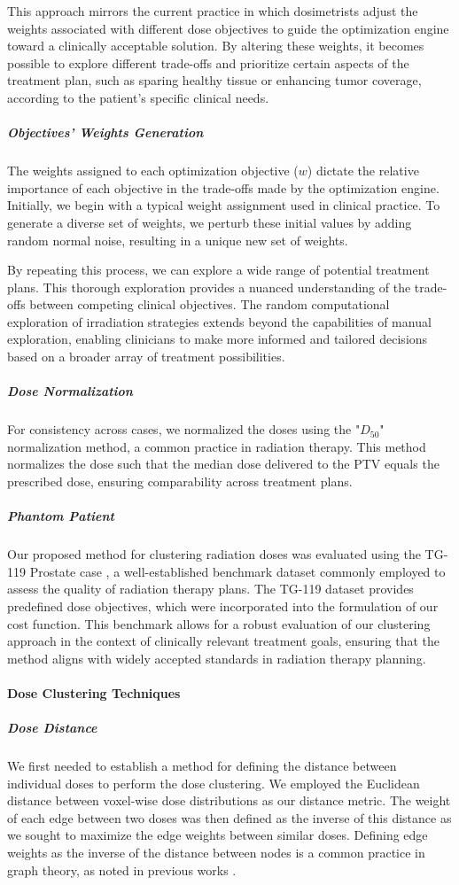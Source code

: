 This approach mirrors the current practice in which dosimetrists adjust the weights associated with different dose objectives to guide the optimization engine toward a clinically acceptable solution.
By altering these weights, it becomes possible to explore different trade-offs and prioritize certain aspects of the treatment plan, such as sparing healthy tissue or enhancing tumor coverage, according to the patient's specific clinical needs.

\subparagraph{Objectives’ Weights Generation}
The weights assigned to each optimization objective ($w$) dictate the relative importance of each objective in the trade-offs made by the optimization engine.
Initially, we begin with a typical weight assignment used in clinical practice.
To generate a diverse set of weights, we perturb these initial values by adding random normal noise, resulting in a unique new set of weights.

By repeating this process, we can explore a wide range of potential treatment plans.
This thorough exploration provides a nuanced understanding of the trade-offs between competing clinical objectives.
The random computational exploration of irradiation strategies extends beyond the capabilities of manual exploration, enabling clinicians to make more informed and tailored decisions based on a broader array of treatment possibilities.

\subparagraph{Dose Normalization}
For consistency across cases, we normalized the doses using the "$D_{50}$" normalization method, a common practice in radiation therapy.
This method normalizes the dose such that the median dose delivered to the PTV equals the prescribed dose, ensuring comparability across treatment plans.

\subparagraph{Phantom Patient}
Our proposed method for clustering radiation doses was evaluated using the TG-119 Prostate case \cite{AAPM-TG119}, a well-established benchmark dataset commonly employed to assess the quality of radiation therapy plans.
The TG-119 dataset provides predefined dose objectives, which were incorporated into the formulation of our cost function.
This benchmark allows for a robust evaluation of our clustering approach in the context of clinically relevant treatment goals, ensuring that the method aligns with widely accepted standards in radiation therapy planning.

\paragraph{Dose Clustering Techniques}
\subparagraph{Dose Distance}
We first needed to establish a method for defining the distance between individual doses to perform the dose clustering.
We employed the Euclidean distance between voxel-wise dose distributions as our distance metric.
The weight of each edge between two doses was then defined as the inverse of this distance as we sought to maximize the edge weights between similar doses.
Defining edge weights as the inverse of the distance between nodes is a common practice in graph theory, as noted in previous works \cite{Maleika2020} \cite{Li2018}.

